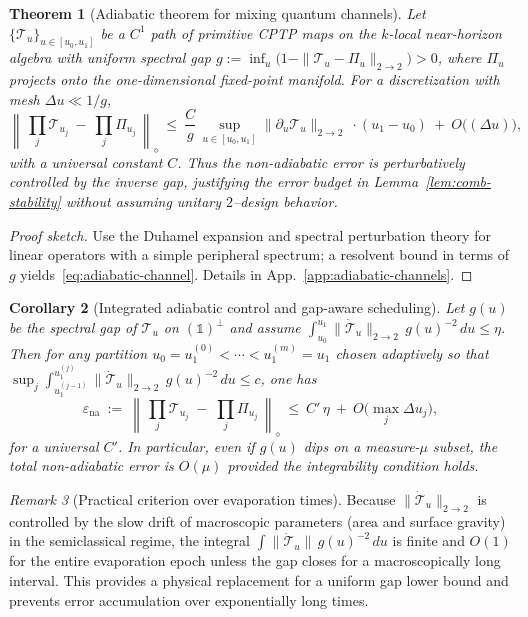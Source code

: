 \documentclass[11pt,a4paper]{article}
\theoremstyle{plain}
\newtheorem{theorem}{Theorem}
\newtheorem{corollary}[theorem]{Corollary}
\theoremstyle{definition}
\theoremstyle{remark}
\newtheorem{remark}[theorem]{Remark}
\begin{document}
\begin{theorem}[Adiabatic theorem for mixing quantum channels]\label{thm:adiabatic-channel}
Let $\{\mathcal{T}_u\}_{u\in[u_0,u_1]}$ be a $C^1$ path of primitive CPTP maps on the $k$-local near-horizon algebra with uniform spectral gap $g:=\inf_u\big(1-\|\mathcal{T}_u-\Pi_u\|_{2\to 2}\big)>0$, where $\Pi_u$ projects onto the one-dimensional fixed-point manifold. For a discretization with mesh $\Delta u\ll 1/g$,
\begin{equation}\label{eq:adiabatic-channel}
\left\|\,\prod_{j}\mathcal{T}_{u_j}\ -\ \prod_{j}\Pi_{u_j}\,\right\|_\diamond\ \le\ \frac{C}{g}\,\sup_{u\in[u_0,u_1]}\|\partial_u \mathcal{T}_u\|_{2\to 2}\ \cdot (u_1-u_0)\ +\ O\!\big((\Delta u)\big),
\end{equation}
with a universal constant $C$. Thus the non-adiabatic error is perturbatively controlled by the inverse gap, justifying the error budget in Lemma~\ref{lem:comb-stability} without assuming unitary $2$--design behavior.
\end{theorem}
\begin{proof}[Proof sketch]
Use the Duhamel expansion and spectral perturbation theory for linear operators with a simple peripheral spectrum; a resolvent bound in terms of $g$ yields~\eqref{eq:adiabatic-channel}. Details in App.~\ref{app:adiabatic-channels}.
\end{proof}


\begin{corollary}[Integrated adiabatic control and gap-aware scheduling]\label{cor:adiabatic-integrated}
Let $g(u)$ be the spectral gap of $\mathcal{T}_u$ on $(\mathbb{1})^\perp$ and assume $\int_{u_0}^{u_1}\|\dot{\mathcal{T}}_u\|_{2\to 2}\,g(u)^{-2}\,du\le \eta$.
Then for any partition $u_0=u_1^{(0)}<\cdots<u_1^{(m)}=u_1$ chosen adaptively so that $\sup_j \int_{u_1^{(j-1)}}^{u_1^{(j)}}\|\dot{\mathcal{T}}_u\|_{2\to 2}\,g(u)^{-2}\,du\le c$,
one has
\[
\varepsilon_{\mathrm{na}} \ :=\ \left\|\,\prod_{j}\mathcal{T}_{u_j}\;-\;\prod_{j}\Pi_{u_j}\,\right\|_{\diamond}\ \le\ C'\,\eta\ +\ O\!\big(\max_j \Delta u_j\big),
\]
for a universal $C'$. In particular, even if $g(u)$ dips on a measure-$\mu$ subset, the total non-adiabatic error is $O(\mu)$ provided the integrability condition holds.
\end{corollary}

\begin{remark}[Practical criterion over evaporation times]\label{rem:integrated-criterion}
Because $\|\dot{\mathcal{T}}_u\|_{2\to 2}$ is controlled by the slow drift of macroscopic parameters (area and surface gravity) in the semiclassical regime,
the integral $\int \|\dot{\mathcal{T}}_u\|\,g(u)^{-2}\,du$ is finite and $O(1)$ for the entire evaporation epoch unless the gap closes for a macroscopically long interval.
This provides a physical replacement for a uniform gap lower bound and prevents error accumulation over exponentially long times.
\end{remark}
\end{document}

